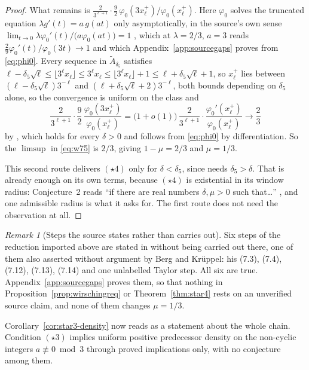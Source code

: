 \documentclass[11pt]{article}
\theoremstyle{definition}
\theoremstyle{remark}
\newtheorem{remark}[theorem]{Remark}
\begin{document}
\begin{proof}
What remains is $\tfrac{2}{3^{\ell+1}}\cdot\tfrac92\,
\varphi_0(3x_\ell^+)/\varphi_0(x_\ell^+)$. Here
$\varphi_0$ solves the truncated equation $\lambda g'(t)=a\,g(at)$ only
asymptotically, in the source's own sense
$\lim_{t\to0}\lambda\varphi_0'(t)/\bigl(a\varphi_0(at)\bigr)=1$
\cite[eq.~(7.12)]{Wirsching2003}, which at $\lambda=2/3$, $a=3$ reads
$\tfrac29\varphi_0'(t)/\varphi_0(3t)\to1$ and which
Appendix~\ref{app:sourcegaps} proves from \eqref{eq:phi0}. Every sequence in
$\widetilde A_{\delta_5}$ satisfies
$\ell-\delta_5\sqrt\ell\le\lfloor3^\ell x_\ell\rfloor\le3^\ell x_\ell
\le\lfloor3^\ell x_\ell\rfloor+1\le\ell+\delta_5\sqrt\ell+1$, so
$x_\ell^+$ lies between $(\ell-\delta_5\sqrt\ell)3^{-\ell}$ and
$(\ell+\delta_5\sqrt\ell+2)3^{-\ell}$, both bounds depending on
$\delta_5$ alone, so the convergence is uniform on the class and
\[
 \frac{2}{3^{\ell+1}}\cdot\frac92\,
 \frac{\varphi_0(3x_\ell^+)}{\varphi_0(x_\ell^+)}
 =\bigl(1+o(1)\bigr)\,\frac{2}{3^{\ell+1}}\cdot
  \frac{\varphi_0'(x_\ell^+)}{\varphi_0(x_\ell^+)}
 \longrightarrow\frac23
\]
by \cite[eq.~(7.13)]{Wirsching2003}, which holds for every $\delta>0$
and follows from \eqref{eq:phi0} by differentiation. So the
$\limsup$ in \eqref{eq:w75} is $2/3$, giving $1-\mu=2/3$ and
$\mu=1/3$.

This second route delivers $(\star4)$ only for $\delta<\delta_5$, since
\cite[eq.~(7.14)]{Wirsching2003} needs $\delta_5>\delta$. That is
already enough on its own terms, because $(\star4)$ is existential in
its window radius: Conjecture~2 reads ``if there are real numbers
$\delta,\mu>0$ such that\ldots'' \cite[\S6]{Wirsching2003}, and one
admissible radius is what it asks for. The first route does not need
the observation at all.
\end{proof}

\begin{remark}[Steps the source states rather than carries out]
\label{rem:source-gaps}
Six steps of the reduction imported above are stated in
\cite[\S7]{Wirsching2003} without being carried out there, one of them
also asserted without argument by Berg and Kr\"uppel: his (7.3), (7.4),
(7.12), (7.13), (7.14) and one unlabelled Taylor step. All six are
true. Appendix~\ref{app:sourcegaps} proves them, so that nothing in
Proposition~\ref{prop:wirschingreq} or Theorem~\ref{thm:star4} rests on
an unverified source claim, and none of them changes $\mu=1/3$.
\end{remark}

Corollary~\ref{cor:star3-density} now reads as a statement about the
whole chain. Condition $(\star3)$ implies uniform positive predecessor
density on the non-cyclic integers $a\not\equiv0\bmod3$ through proved
implications only, with no conjecture among them.
\end{document}
